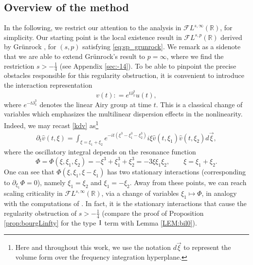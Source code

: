 \documentclass[a4paper,
11pt,  reqno]{amsart}
\newcommand{\I}{\hspace{0.2mm}\textup{I}\hspace{0.2mm}}
\newcommand{\5}{\textup{V}}
\newcommand{\FL}{\mathcal{F} L}
\newcommand{\dx}{\partial_x}
\newcommand{\dt}{\partial_t}
\theoremstyle{remark}
\newcommand{\R}{\mathbb{R}}
\numberwithin{equation}{section}
\numberwithin{theorem}{section}
\begin{document}
\subsection{Overview of the method}
\label{SUBSEC:method}

In the following, we restrict our attention to the analysis in $\FL^{s,\infty}(\R)$, for simplicity. 
	Our starting point is the local existence result in $\mathcal{F}L^{s,p}(\R)$ derived by Grünrock \cite{Grunrock_ldv_hier}, for $(s,p)$ satisfying \eqref{eq:sp_grunrock}. We remark as a sidenote that we are able to extend Grünrock's result to $p=\infty$, where we find the restriction $s>-\frac14$ (see Appendix \ref{sec:-14}).
	To be able to pinpoint the precise obstacles responsible for this regularity obstruction,  it is convenient to introduce the interaction representation \cite{Ginibre_interaction_rep}
	\begin{equation}\label{inter}
		v(t) : = e^{t\partial_x^3}u(t),
	\end{equation} 
	where $e^{-t\dx^3}$ denotes the linear Airy group at time $t$. 
This is a classical change of variables which emphasizes the multilinear dispersion effects in the nonlinearity. 
Indeed, we may recast \eqref{kdv} as\footnote{Here and throughout this work, we use the notation $d\vec{\xi}$ to represent the volume form over the frequency integration hyperplane.}
	\begin{align}
		\label{dtv}
		\dt{\widehat{v}}(t,\xi) = \int_{\xi = \xi_1+\xi_2} e^{-it (\xi^3 -\xi_1^3 -
			\xi^3_2)} i \xi \widehat{v}(t,\xi_1) \widehat{v}(t,\xi_2)  d\vec{\xi}
		,
	\end{align}
where the oscillatory integral depends on the resonance function
	\begin{equation}\label{phase-intro}
		\Phi = \Phi(\xi,\xi_1,\xi_2)=-\xi^3+\xi_1^3+\xi_2^3 = -3\xi\xi_1\xi_2, \qquad \xi=\xi_1+\xi_2.
	\end{equation}
One can see that $\Phi(\xi, \xi_1, \xi-\xi_1)$ has two stationary interactions 
(corresponding to $\partial_{\xi_1}\Phi=0$), namely $\xi_1=\xi_2$ and $\xi_1=-\xi_2$. Away from these points, we can reach scaling criticality in $\FL^{s,\infty}(\R)$, via a change of variables $\xi_1\mapsto \Phi$, in analogy with the computations of \cite{kpv_bilin}.
In fact, it is the stationary interactions that cause the regularity obstruction of $s>-\frac14$ (compare the proof of Proposition \ref{prop:bourgLinfty} for the type $\I$ term with Lemma \ref{LEM:bil0}).
    
\end{document}
